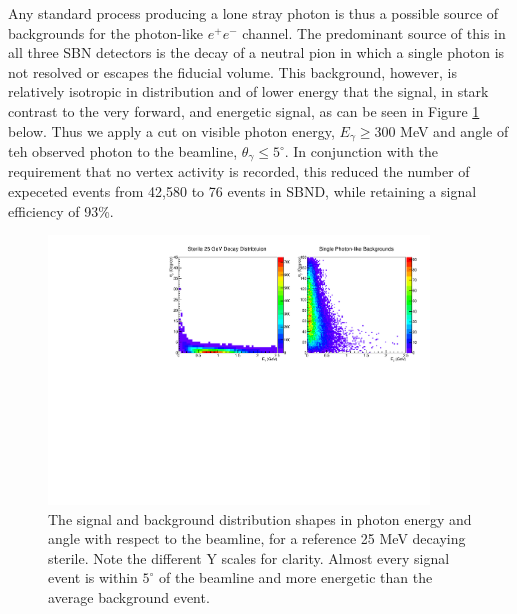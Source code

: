 \documentclass[11pt, a4paper]{article}
\begin{document}
Any standard process producing a lone stray photon is thus a possible source of
backgrounds for the photon-like $e^+e^-$ channel. The predominant source of this in all three SBN
detectors is the decay of a neutral pion in which a single photon is not
resolved or escapes the fiducial volume. This background, however, is relatively isotropic in distribution and of lower energy that the signal, in
stark contrast to the very forward, and energetic signal, as can be seen in Figure \ref{fig:gamma_dist} below. Thus we apply a cut on visible photon energy, $E_\gamma \geq 300 $ MeV and angle of teh observed photon to the beamline, $\theta_\gamma \leq 5^\circ$. In conjunction with the requirement that no vertex activity is recorded, this reduced the number of expeceted events from 42,580 to 76 events in SBND, while retaining a signal efficiency of 93\%.
\begin{figure}[t]
\center
\includegraphics[width=0.9\textwidth,clip,trim=0 0 0 0]{figures/gamma_dist.pdf}
\caption{\label{fig:gamma_dist} The signal and background distribution shapes in photon energy and angle with respect to the beamline, for a reference 25 MeV decaying sterile.  Note the different Y scales for clarity. Almost every signal event is within $5^\circ$  of the beamline and more energetic than the average background event.}

\end{figure}
\end{document}
